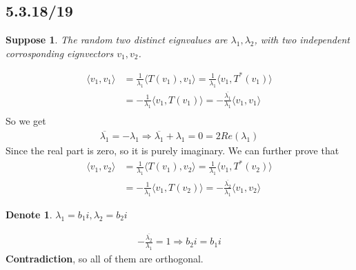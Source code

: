\documentclass{article}
\newtheorem*{suppose}{Suppose}
\newtheorem*{denote}{Denote}
\begin{document}
\subsection*{5.3.18/19}
\begin{suppose}
    The random two distinct eignvalues are $\lambda_1, \lambda_2$, with two independent corrosponding eignvectors $v_1, v_2$.
\end{suppose}
\begin{equation*}
    \begin{split}
        \langle v_1 ,v_1 \rangle &= \frac{1}{\lambda_1} \langle T(v_1), v_1 \rangle = \frac{1}{\lambda_1} \langle v_1, T^*(v_1) \rangle\\
         &= -\frac{1}{\lambda_1} \langle v_1, T(v_1) \rangle = -\frac{\overline{\lambda_1}}{\lambda_1} \langle v_1, v_1 \rangle
         \\ 
    \end{split}
\end{equation*}
So we get
\begin{equation*}
    \begin{split}
        \overline{\lambda_1} = -\lambda_1 \Rightarrow  \overline{\lambda_1} + \lambda_1 = 0 = 2Re(\lambda_1)
    \end{split}
\end{equation*} 
Since the real part is zero, so it is purely imaginary. We can further prove that
\begin{equation*}
    \begin{split}
        \langle v_1 ,v_2 \rangle &= \frac{1}{\lambda_1} \langle T(v_1), v_2 \rangle = \frac{1}{\lambda_1} \langle v_1, T^*(v_2) \rangle\\
         &= -\frac{1}{\lambda_1} \langle v_1, T(v_2) \rangle = -\frac{\overline{\lambda_2}}{\lambda_1} \langle v_1, v_2 \rangle
    \end{split}
\end{equation*} 
\begin{denote}
    $\lambda_1 = b_1i, \lambda_2 = b_2 i$
\end{denote}
\begin{equation*}
    \begin{split}
        -\frac{\overline{\lambda_2}}{\lambda_1} = 1 \Rightarrow b_2i = b_1i
    \end{split}
\end{equation*}
\textbf{Contradiction}, so all of them are orthogonal.
\end{document}
